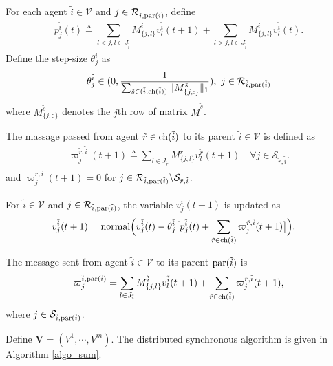 \documentclass[journal]{IEEEtran}
\begin{document}
\par  For each agent $\tilde{i}\in\mathcal V$ and $j\in \mathcal{R}_{\tilde{i},{\rm par}(\tilde{i})}$, define $$p_j^{\tilde{i}}(t)\triangleq\sum_{l<j,l\in J_{\tilde{i}}} M_{\{j,l\}}^{\tilde{i}} {v}_l^{\tilde{i}}(t+1)+\sum_{l>j,l\in J_{\tilde{i}}} M_{\{j,l\}}^{\tilde{i}} {v}_l^{\tilde{i}}(t).$$ 
Define  the step-size $\theta_j^{\tilde{i}}$ as
\begin{align}\label{theta_de}
\theta_j^{\tilde{i}} \in(0,\frac{1}{\sum_{\tilde{s}\in (\tilde{i}, {\rm ch}(\tilde{i}))}\|M_{\{j,:\}}^{\tilde{s}}\|_1}),\ j\in \mathcal{R}_{\tilde{i},{\rm par}(\tilde{i})}
\end{align}
where $M_{\{j,:\}}^{\tilde{s}}$ denotes the $j$th row of matrix $\overline{M}^{\tilde{s}}$.
\par The massage passed from agent $\tilde{r}\in {\rm ch}(\tilde{i})$ to its parent  $\tilde{i}\in \mathcal{V}$ is defined as
\begin{align}\label{distri_mes_syn}
\varpi_j^{\tilde{r},\tilde{i}}(t+1) \triangleq  \sum_{l\in J_{\tilde{r}}} M_{\{j,l\}}^{\tilde{r}} v_l^{\tilde{r}}(t+1) \quad \forall j \in \mathcal{S}_{\tilde{r},\tilde{i}}.
\end{align}
and $\varpi_j^{\tilde{r},\tilde{i}}(t+1)=0$ for $j\in \mathcal{R}_{\tilde{i},{\rm par}(\tilde{i})}\backslash \mathcal{S}_{\tilde{r},\tilde{i}}$.

For $\tilde i\in\mathcal V$ and $j\in \mathcal{R}_{\tilde{i},{\rm par}(\tilde{i})}$, the variable $v_j^{\tilde{i}}(t+1)$  is updated as
\begin{align}\label{vupdatesm}
&v_j^{\tilde{i}}(t+1)={\rm normal}\Big(v_j^{\tilde{i}}(t)-\theta_j^{\tilde{i}} \big[p_j^{\tilde{i}}(t)+\sum_{\tilde{r}\in {\rm ch}(\tilde{i})}\varpi_j^{\tilde{r},\tilde{i}}(t+1)\big]\Big).
\end{align}


The message sent from agent $\tilde i\in\mathcal V$ to its parent ${\rm par}(\tilde{i})$ is
\begin{align}\label{message2par}
\varpi_j^{\tilde{i},{\rm par}(\tilde{i})} =\sum_{l\in J_{\tilde{i}}} M_{\{j,l\}}^{\tilde{i}} v_l^{\tilde{i}}(t+1)+\sum_{\tilde{r} \in {\rm ch}(\tilde{i})}\varpi_j^{\tilde{r},\tilde{i}}(t+1),
\end{align}		
where $j\in \mathcal{S}_{\tilde{i},{\rm par}(\tilde{i})}$.

Define $\mathbf V = (V^{1},\cdots,V^{m})$. The distributed synchronous algorithm is given in Algorithm \ref{algo_sum}.
\end{document}
